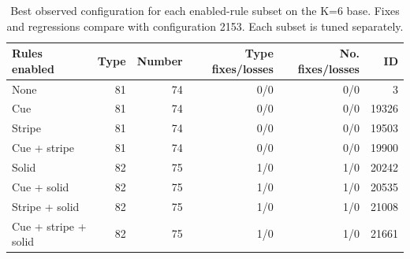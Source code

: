 \begin{table}[htbp]
\centering
\small
\caption{Best observed configuration for each enabled-rule subset on the K=6 base. Fixes and regressions compare with configuration 2153. Each subset is tuned separately.}
\label{tab:cca-search-ablation}
\begin{tabular}{lrrrrr}
\toprule
Rules enabled & Type & Number & Type fixes/losses & No. fixes/losses & ID \\
\midrule
None & 81 & 74 & 0/0 & 0/0 & 3 \\
Cue & 81 & 74 & 0/0 & 0/0 & 19326 \\
Stripe & 81 & 74 & 0/0 & 0/0 & 19503 \\
Cue + stripe & 81 & 74 & 0/0 & 0/0 & 19900 \\
Solid & 82 & 75 & 1/0 & 1/0 & 20242 \\
Cue + solid & 82 & 75 & 1/0 & 1/0 & 20535 \\
Stripe + solid & 82 & 75 & 1/0 & 1/0 & 21008 \\
Cue + stripe + solid & 82 & 75 & 1/0 & 1/0 & 21661 \\
\bottomrule
\end{tabular}
\end{table}
\FloatBarrier
